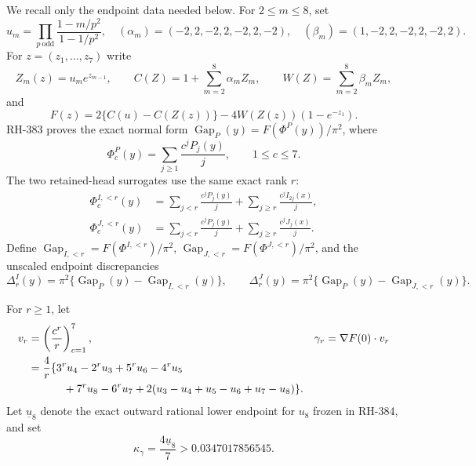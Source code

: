 \documentclass[11pt]{article}
\theoremstyle{definition}
\theoremstyle{remark}
\newcommand{\PhiP}{\Phi^{P}}
\newcommand{\PhiI}{\Phi^{I,<r}}
\newcommand{\PhiJ}{\Phi^{J,<r}}
\newcommand{\GapP}{\operatorname{Gap}_{P}}
\newcommand{\GapI}{\operatorname{Gap}_{I,<r}}
\newcommand{\GapJ}{\operatorname{Gap}_{J,<r}}
\newcommand{\DeltaI}{\Delta^{I}}
\newcommand{\DeltaJ}{\Delta^{J}}
\begin{document}
We recall only the endpoint data needed below.  For $2\le m\le8$, set
\begin{equation}
 u_m=\prod_{p\ \mathrm{odd}}\frac{1-m/p^2}{1-1/p^2},\quad
 (\alpha_m)=(-2,2,-2,2,-2,2,-2),\quad
 (\beta_m)=(1,-2,2,-2,2,-2,2).
 \label{eq:endpoint-data}
\end{equation}
For $z=(z_1,\ldots,z_7)$ write
\[
 Z_m(z)=u_me^{z_{m-1}},\qquad
 C(Z)=1+\sum_{m=2}^8\alpha_mZ_m,\qquad
 W(Z)=\sum_{m=2}^8\beta_mZ_m,
\]
and
\begin{equation}
 F(z)=2\{C(u)-C(Z(z))\}-4W(Z(z))(1-e^{-z_1}).
 \label{eq:endpoint-map}
\end{equation}
RH-383 proves the exact normal form
$\GapP(y)=F(\PhiP(y))/\pi^2$, where
\begin{equation}
 \PhiP_c(y)=\sum_{j\ge1}\frac{c^jP_j(y)}j,
 \qquad 1\le c\le7.
 \label{eq:actual-coordinate}
\end{equation}
The two retained-head surrogates use the same exact rank $r$:
\begin{align}
 \PhiI_c(y)&=\sum_{j<r}\frac{c^jP_j(y)}j
      +\sum_{j\ge r}\frac{c^jI_{2j}(x)}j,
 \label{eq:I-coordinate}\\
 \PhiJ_c(y)&=\sum_{j<r}\frac{c^jP_j(y)}j
      +\sum_{j\ge r}\frac{c^jJ_j(x)}j.
 \label{eq:J-coordinate}
\end{align}
Define $\GapI=F(\PhiI)/\pi^2$, $\GapJ=F(\PhiJ)/\pi^2$, and the
unscaled endpoint discrepancies
\begin{equation}
 \DeltaI_r(y)=\pi^2\{\GapP(y)-\GapI(y)\},\qquad
 \DeltaJ_r(y)=\pi^2\{\GapP(y)-\GapJ(y)\}.
 \label{eq:endpoint-errors}
\end{equation}

For $r\ge1$, let
\begin{align}
 v_r&=\left(\frac{c^r}{r}\right)_{c=1}^7,
 &\gamma_r&=\nabla F(0)\mathbin{\cdot}v_r \notag\\
 &=\frac4r\{3^ru_4-2^ru_3+5^ru_6-4^ru_5 \notag\\
 &\hspace{3.2em}+7^ru_8-6^ru_7
   +2(u_3-u_4+u_5-u_6+u_7-u_8)\}.
 \label{eq:gamma}
\end{align}
Let $\underline u_8$ denote the exact outward rational lower endpoint
for $u_8$ frozen in RH-384, and set
\begin{equation}
 \kappa_\gamma=\frac{4\underline u_8}{7}
 >0.0347017856545.
 \label{eq:kappa}
\end{equation}
\end{document}
